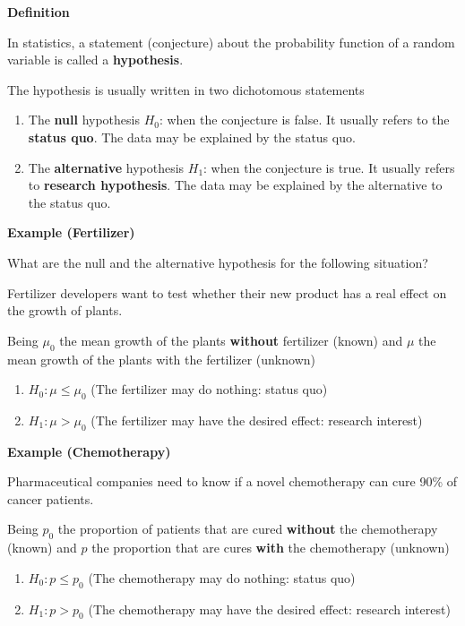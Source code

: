 \documentclass[
]{book}
\providecommand{\tightlist}{%
  \setlength{\itemsep}{0pt}\setlength{\parskip}{0pt}}
\begin{document}
\textbf{Definition}

In statistics, a statement (conjecture) about the probability function of a random variable is called a \textbf{hypothesis}.

The hypothesis is usually written in two dichotomous statements

\begin{enumerate}
\def\labelenumi{\alph{enumi}.}
\item
  The \textbf{null} hypothesis \(H_0\): when the conjecture is false. It usually refers to the \textbf{status quo}. The data may be explained by the status quo.
\item
  The \textbf{alternative} hypothesis \(H_1\): when the conjecture is true. It usually refers to \textbf{research hypothesis}. The data may be explained by the alternative to the status quo.
\end{enumerate}

\textbf{Example (Fertilizer)}

What are the null and the alternative hypothesis for the following situation?

Fertilizer developers want to test whether their new product has a real effect on the growth of plants.

Being \(\mu_0\) the mean growth of the plants \textbf{without} fertilizer (known) and \(\mu\) the mean growth of the plants with the fertilizer (unknown)

\begin{enumerate}
\def\labelenumi{\alph{enumi}.}
\tightlist
\item
  \(H_0:\mu \leq \mu_0\) (The fertilizer may do nothing: status quo)
\item
  \(H_1:\mu > \mu_0\) (The fertilizer may have the desired effect: research interest)
\end{enumerate}

\textbf{Example (Chemotherapy)}

Pharmaceutical companies need to know if a novel chemotherapy can cure 90\% of cancer patients.

Being \(p_0\) the proportion of patients that are cured \textbf{without} the chemotherapy (known) and \(p\) the proportion that are cures \textbf{with} the chemotherapy (unknown)

\begin{enumerate}
\def\labelenumi{\alph{enumi}.}
\tightlist
\item
  \(H_0:p \leq p_0\) (The chemotherapy may do nothing: status quo)
\item
  \(H_1: p > p_0\) (The chemotherapy may have the desired effect: research interest)
\end{enumerate}
\end{document}
